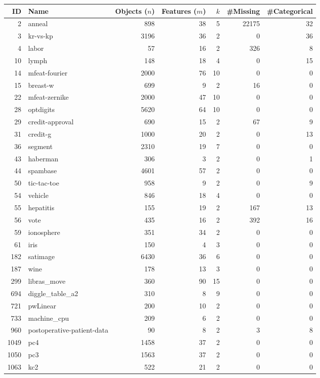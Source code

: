 \begin{tabular}{rlrrrr r}
\toprule
\textbf{ID} & \textbf{Name} & \textbf{Objects ($n$)} & \textbf{Features ($m$)} & \textbf{$k$} & \textbf{\#Missing} & \textbf{\#Categorical} \\
\midrule
2 & anneal & 898 & 38 & 5 & 22175 & 32 \\
3 & kr-vs-kp & 3196 & 36 & 2 & 0 & 36 \\
4 & labor & 57 & 16 & 2 & 326 & 8 \\
10 & lymph & 148 & 18 & 4 & 0 & 15 \\
14 & mfeat-fourier & 2000 & 76 & 10 & 0 & 0 \\
15 & breast-w & 699 & 9 & 2 & 16 & 0 \\
22 & mfeat-zernike & 2000 & 47 & 10 & 0 & 0 \\
28 & optdigits & 5620 & 64 & 10 & 0 & 0 \\
29 & credit-approval & 690 & 15 & 2 & 67 & 9 \\
31 & credit-g & 1000 & 20 & 2 & 0 & 13 \\
36 & segment & 2310 & 19 & 7 & 0 & 0 \\
43 & haberman & 306 & 3 & 2 & 0 & 1 \\
44 & spambase & 4601 & 57 & 2 & 0 & 0 \\
50 & tic-tac-toe & 958 & 9 & 2 & 0 & 9 \\
54 & vehicle & 846 & 18 & 4 & 0 & 0 \\
55 & hepatitis & 155 & 19 & 2 & 167 & 13 \\
56 & vote & 435 & 16 & 2 & 392 & 16 \\
59 & ionosphere & 351 & 34 & 2 & 0 & 0 \\
61 & iris & 150 & 4 & 3 & 0 & 0 \\
182 & satimage & 6430 & 36 & 6 & 0 & 0 \\
187 & wine & 178 & 13 & 3 & 0 & 0 \\
299 & libras\_move & 360 & 90 & 15 & 0 & 0 \\
694 & diggle\_table\_a2 & 310 & 8 & 9 & 0 & 0 \\
721 & pwLinear & 200 & 10 & 2 & 0 & 0 \\
733 & machine\_cpu & 209 & 6 & 2 & 0 & 0 \\
960 & postoperative-patient-data & 90 & 8 & 2 & 3 & 8 \\
1049 & pc4 & 1458 & 37 & 2 & 0 & 0 \\
1050 & pc3 & 1563 & 37 & 2 & 0 & 0 \\
1063 & kc2 & 522 & 21 & 2 & 0 & 0 \\

\end{tabular}

